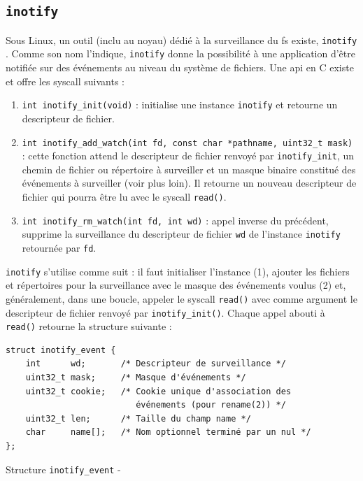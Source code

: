 \documentclass[a4paper, 12pt]{article}
\newenvironment{code}{\captionsetup{type=listing}}{}
\begin{document}
\subsection{\texttt{inotify}}\label{inotify_techno}
Sous Linux, un outil (inclu au noyau) dédié à la surveillance du \acrshort{fs} existe, \texttt{inotify} 
\cite{ref29}. Comme son nom l'indique, \texttt{inotify} donne la possibilité à une application d'être 
notifiée sur des événements au niveau du système de fichiers. Une \acrshort{api} en C existe et 
offre les \acrshort{syscall} suivants :
\begin{enumerate}
    \item \texttt{int inotify_init(void)} : initialise une instance \texttt{inotify} et retourne un 
        descripteur de fichier.
    \item \texttt{int inotify_add_watch(int fd, const char *pathname, uint32_t mask)} : 
        cette fonction attend le descripteur de fichier renvoyé par \texttt{inotify_init}, 
        un chemin de fichier ou répertoire à surveiller et un masque binaire constitué des 
        événements à surveiller (voir plus loin). Il retourne un nouveau descripteur de fichier 
        qui pourra être lu avec le \acrshort{syscall} \texttt{read()}.
    \item \texttt{int inotify_rm_watch(int fd, int wd)} : appel inverse du précédent, 
        supprime la surveillance du descripteur de fichier \texttt{wd} de l'instance \texttt{inotify} 
        retournée par \texttt{fd}.
\end{enumerate}
\texttt{inotify} s'utilise comme suit : il faut initialiser l'instance (1), ajouter les fichiers et répertoires 
pour la surveillance avec le masque des événements voulus (2) et, généralement, dans une boucle, 
appeler le \acrshort{syscall} \texttt{read()} avec comme argument le descripteur de fichier 
renvoyé par \texttt{inotify_init()}. Chaque appel abouti à \texttt{read()} retourne 
la structure suivante :
\bigbreak
\begin{code}
    \begin{verbatim}
struct inotify_event {
    int      wd;       /* Descripteur de surveillance */
    uint32_t mask;     /* Masque d'événements */
    uint32_t cookie;   /* Cookie unique d'association des
                          événements (pour rename(2)) */
    uint32_t len;      /* Taille du champ name */
    char     name[];   /* Nom optionnel terminé par un nul */
};
    \end{verbatim}
    \caption{Structure \texttt{inotify_event} - \cite{ref29}}
\end{code}
\end{document}
